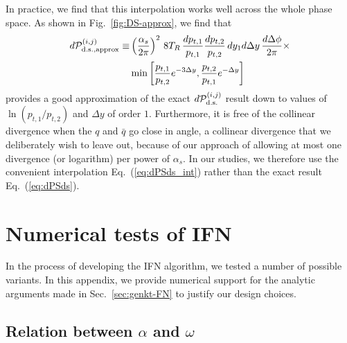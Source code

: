 \documentclass[nofootinbib,twocolumn,preprintnumbers,superscriptaddress,aps]{revtex4-2}
\newcommand{\as}{\alpha_s}
\begin{document}
In practice, we find that
this interpolation works well across the whole phase space.
As shown in Fig.~\ref{fig:DS-approx},
we find that 
\begin{align}
  d\mathcal P^{(i,j)}_{\rm d.s., approx} \equiv
  &\left(\frac{\as}{2\pi}\right)^2\, 8 T_R\,
  \frac{dp_{t,1}}{p_{t,1}} \frac{dp_{t,2}}{p_{t,2}}
  \, d y_1 d\Delta y\, \frac{d\Delta\phi}{2\pi}
  \times
  \nonumber\\
  &
  \min\left[\frac{p_{t,1}}{p_{t,2}}e^{-3\Delta y},
    \frac{p_{t,2}}{p_{t,1}}e^{-\Delta y}\right]
  \label{eq:dPSds_int}
\end{align}
provides a good approximation of the exact $d \mathcal P^{(i,j)}_{\rm
  d.s.}$ result down to values of $\ln (p_{t,1}/p_{t,2})$ and $\Delta
y$ of order $1$.
%
Furthermore, it is free of the collinear divergence when the $q$ and
$\bar q$ go close in angle, a collinear divergence that we
deliberately wish to leave out, because of our approach of allowing at
most one divergence (or logarithm) per power of $\as$. 
%
In our studies, we therefore
use the convenient interpolation Eq.~(\ref{eq:dPSds_int}) rather than the
exact result Eq.~(\ref{eq:dPSds}).


\section{Numerical tests of IFN}
\label{sec:IRCapp-IFN}

In the process of developing the IFN algorithm, we tested a number of possible variants.
%
In this appendix, we provide numerical support for the analytic arguments made in Sec.~\ref{sec:genkt-FN} to justify our design choices.


\subsection{Relation between $\alpha$ and $\omega$}
\label{sec:IFN-omega}
\end{document}
